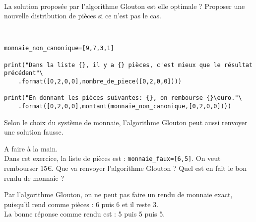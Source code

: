 \begin{exercice}~\\
La solution proposée par l'algorithme Glouton est elle optimale ? Proposer une nouvelle distribution de pièces si ce n'est pas le cas.
\end{exercice}

\begin{solution}~\ \\
\begin{verbatim}
monnaie_non_canonique=[9,7,3,1]

print("Dans la liste {}, il y a {} pièces, c'est mieux que le résultat précédent"\
	.format([0,2,0,0],nombre_de_piece([0,2,0,0])))

print("En donnant les pièces suivantes: {}, on rembourse {}\euro."\
	.format([0,2,0,0],montant(monnaie_non_canonique,[0,2,0,0])))
\end{verbatim}
\end{solution}

Selon le choix du système de monnaie, l'algorithme Glouton peut aussi renvoyer une solution fausse.

\begin{exercice}A faire à la main.\\
Dans cet exercice, la liste de pièces est : \verb?monnaie_faux=[6,5]?. On veut rembourser 15\euro . Que va renvoyer l'algorithme Glouton ? Quel est en fait le bon rendu de monnaie ?
\end{exercice}

\begin{solution}
Par l'algorithme Glouton, on ne peut pas faire un rendu de monnaie exact, puisqu'il rend comme pièces : 6 puis 6 et il reste 3.\\
La bonne réponse comme rendu est : 5 puis 5 puis 5.
\end{solution}

